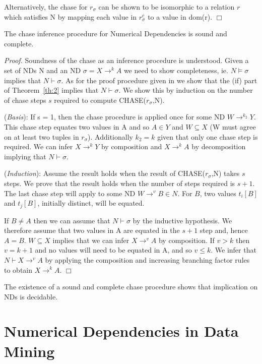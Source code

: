 \smallskip
Alternatively, the chase for $r_\sigma$ can be shown to be isomorphic
to a relation $r$ which satisfies N by mapping each value in
$r_\sigma^c$ to a value in dom(r). $\Box$


\begin{theorem}\label{th:3}
\begin{rm}
The chase inference procedure for Numerical Dependencies is sound and complete.\end{rm}
\end{theorem}

{\em Proof.} Soundness of the chase as an inference procedure is
understood. Given a set of NDs N and an ND $\sigma = X \to^k A$ we
need to show completeness, ie. $N \models \sigma$ implies that $N
\vdash \sigma$. As for the proof procedure given in \cite{ll97c} we show
that the (if) part of Theorem~\ref{th:2} implies that $N \vdash
\sigma$. We show this by induction on the number of chase steps $s$
required to compute CHASE($r_\sigma$,N).

\smallskip
({\em Basis}):
If s = 1, then the chase procedure is applied once for some ND $W
\to^{k_2} Y$. This chase step equates two values in A and so $A \in Y$
 and $W \subseteq X$ (W must agree
on at least two tuples in $r_\sigma$). Additionally $k_2 = k$ given
that only one 
chase step is required. We can infer $X \to^k Y$ by composition and $X
\to^k A$ by decomposition implying that $N \vdash \sigma$.
 
\smallskip
 
({\em Induction}):
Assume the result holds when the result of CHASE($r_\sigma$,N) takes 
$s$ steps. We prove that the result holds when the number of steps
required is $s+1$. The last chase step will apply to some ND $W \to^v B
\in N$. For $B$, two values $t_i[B]$ and $t_j[B]$,
initially distinct, will be equated.

\smallskip
If $B \not= A$ then we can assume that $N \vdash \sigma$ by the
 inductive hypothesis. We therefore assume that two values in A are
 equated in the $s+1$ step and, hence $A = B$. 
$W \subseteq X$ implies that we can infer $X \to^v A$ by
 composition. If $v > k$ then $v = k+1$ and no values will need to be
 equated in A, and so $v \le k$. We infer that $N \vdash X \to^v A$ by
 applying the composition and increasing branching factor
 rules to obtain $X \to^k A$. $\Box$

\smallskip
The existence of a sound and complete chase procedure shows that
implication on NDs is decidable.

\section{Numerical Dependencies in Data Mining}\label{sec:nd_datamine}

